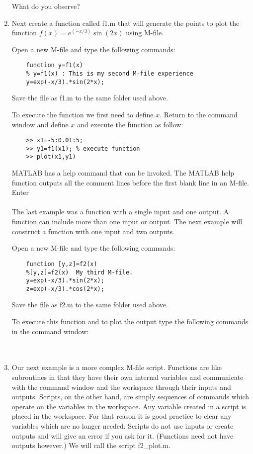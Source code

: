 \begin{enumerate}
  What do you observe?
  
  \item Next create a function called f1.m that will generate the points to plot
  the function $f(x)=e^{(-x/3)}\sin(2x)$ using M-file.
  
  Open a new M-file and type the following commands:
  \begin{verbatim}
    function y=f1(x)
    % y=f1(x) : This is my second M-file experience
    y=exp(-x/3).*sin(2*x);
  \end{verbatim}
  Save the file as f1.m to the same folder used above.
  
  To execute the function we first need to define $x$.  Return to the command
  window and define $x$  and execute the function as follow:\\
  \begin{verbatim}
    >> x1=-5:0.01:5;
    >> y1=f1(x1); % execute function
    >> plot(x1,y1)
  \end{verbatim}
  
  MATLAB has a help command that can be invoked.  The MATLAB help function outputs
  all the comment lines before the first blank line in an M-file.  Enter\\
  \\
  The last example was a function with a single input and one output.  A function
  can include more than one input or output.  The next example will construct a
  function with one input and two outputs.
  
  Open a new M-file and type the following commands:
  \begin{verbatim}
    function [y,z]=f2(x)
    %[y,z]=f2(x)  My third M-file.
    y=exp(-x/3).*sin(2*x);
    z=exp(-x/3).*cos(2*x);
  \end{verbatim}
  Save the file as f2.m to the same folder used above.
  
  To execute this function and to plot the output type the following commands in 
  the command window:\\
  \\
  \\
  
  \item Our next example is a more complex M-file script.  Functions are like
  subroutines in that they have their own internal variables and communicate
  with the command window and the workspace through their inputs and outputs. 
  Scripts, on the other hand, are simply sequences of commands which operate on
  the variables in the workspace.  Any variable created in a script is placed in
  the workspace.  For that reason it is good practice to clear any variables
  which are no longer needed.  Scripts do not use inputs or create outputs and
  will give an error if you ask for it.  (Functions need not have outputs
  however.)  We will call the script f2\_plot.m.
  

\end{enumerate}
